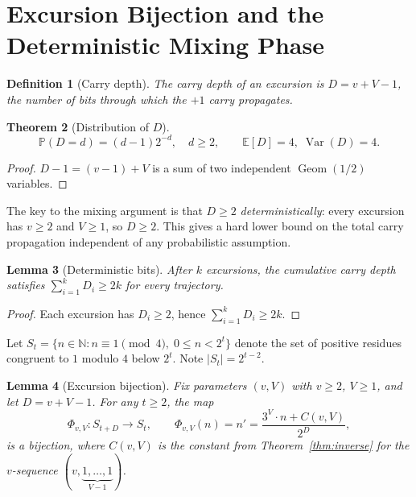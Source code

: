 \documentclass[12pt,a4paper]{article}
\newtheorem{theorem}{Theorem}[section]
\newtheorem{lemma}[theorem]{Lemma}
\newtheorem{definition}[theorem]{Definition}
\newcommand{\N}{\mathbb{N}}
\newcommand{\E}{\mathbb{E}}
\DeclareMathOperator{\Var}{Var}
\newcommand{\Prob}{\mathbb{P}}
\begin{document}
\section{Excursion Bijection and the Deterministic Mixing Phase}\label{sec:mixing}

\begin{definition}[Carry depth]
The \emph{carry depth} of an excursion is $D = v + V - 1$, the number of bits through which the $+1$ carry propagates.
\end{definition}

\begin{theorem}[Distribution of $D$]\label{thm:carry_depth}
\[
\Prob(D = d) = (d-1) 2^{-d}, \quad d \ge 2, \qquad \E[D] = 4,\; \Var(D) = 4.
\]
\end{theorem}

\begin{proof}
$D-1 = (v-1) + V$ is a sum of two independent $\operatorname{Geom}(1/2)$ variables.
\end{proof}

The key to the mixing argument is that $D \ge 2$ \emph{deterministically}: every excursion has $v \ge 2$ and $V \ge 1$, so $D \ge 2$. This gives a hard lower bound on the total carry propagation independent of any probabilistic assumption.

\begin{lemma}[Deterministic bits]\label{lem:deterministic_bits}
After $k$ excursions, the cumulative carry depth satisfies $\sum_{i=1}^k D_i \ge 2k$ for \emph{every} trajectory.
\end{lemma}

\begin{proof}
Each excursion has $D_i \ge 2$, hence $\sum_{i=1}^k D_i \ge 2k$.
\end{proof}

Let $S_t = \{n \in \N : n \equiv 1 \pmod 4,\; 0 \le n < 2^t\}$ denote the set of positive residues congruent to $1$ modulo $4$ below $2^t$. Note $|S_t| = 2^{t-2}$.

\begin{lemma}[Excursion bijection]\label{lem:exc_bijection}
Fix parameters $(v,V)$ with $v \ge 2$, $V \ge 1$, and let $D = v+V-1$. For any $t \ge 2$, the map
\[
\Phi_{v,V}: S_{t+D} \longrightarrow S_t, \qquad
\Phi_{v,V}(n) = n' = \frac{3^V \cdot n + C(v,V)}{2^D},
\]
is a bijection, where $C(v,V)$ is the constant from Theorem~\ref{thm:inverse} for the $v$-sequence $(v,\underbrace{1,\ldots,1}_{V-1})$.
\end{lemma}
\end{document}

